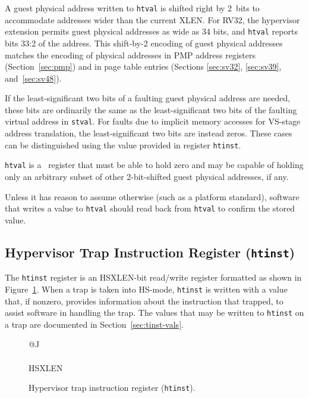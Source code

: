 \begin{commentary}
A guest physical address written to {\tt htval} is shifted right by
2~bits to accommodate addresses wider than the current XLEN.
For RV32, the hypervisor extension permits guest physical addresses as
wide as 34 bits, and {\tt htval} reports bits 33:2 of the address.
This shift-by-2 encoding of guest physical addresses matches the encoding
of physical addresses in PMP address registers (Section~\ref{sec:pmp})
and in page table entries (Sections \ref{sec:sv32}, \ref{sec:sv39},
and~\ref{sec:sv48}).

If the least-significant two bits of a faulting guest physical address
are needed, these bits are ordinarily the same as the least-significant
two bits of the faulting virtual address in {\tt stval}.
For faults due to implicit memory accesses for VS-stage address
translation, the least-significant two bits are instead zeros.
These cases can be distinguished using the value provided in register
{\tt htinst}.
\end{commentary}

{\tt htval} is a \warl\ register that must be able to hold zero and may
be capable of holding only an arbitrary subset of other 2-bit-shifted
guest physical addresses, if any.

\begin{commentary}
Unless it has reason to assume otherwise (such as a platform standard),
software that writes a value to {\tt htval} should read back from
{\tt htval} to confirm the stored value.
\end{commentary}

\subsection{Hypervisor Trap Instruction Register ({\tt htinst})}

The {\tt htinst} register is an HSXLEN-bit read/write register formatted
as shown in Figure~\ref{htinstreg}.
When a trap is taken into HS-mode, {\tt htinst} is written with a value
that, if nonzero, provides information about the instruction that
trapped, to assist software in handling the trap.
The values that may be written to {\tt htinst} on a trap are documented
in Section~\ref{sec:tinst-vals}.

\begin{figure}[h!]
{\footnotesize
\begin{center}
\begin{tabular}{@{}J}
 \\
\hline
{} \\
\hline
HSXLEN \\
\end{tabular}
\end{center}
}
\vspace{-0.1in}
\caption{Hypervisor trap instruction register ({\tt htinst}).}
\label{htinstreg}
\end{figure}

